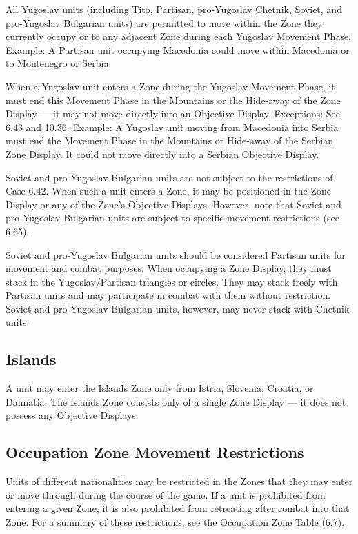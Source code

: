  All Yugoslav units (including Tito, Partisan, pro-Yugoslav Chetnik, Soviet, and pro-Yugoslav Bulgarian units) are permitted to move within the Zone they currently occupy or to any adjacent Zone during each Yugoslav Movement Phase. Example: A Partisan unit occupying Macedonia could move within Macedonia or to Montenegro or Serbia.

 When a Yugoslav unit enters a Zone during the Yugoslav Movement Phase, it must end this Movement Phase in the Mountains or the Hide-away of the Zone Display — it may not move directly into an Objective Display. Exceptions: See 6.43 and 10.36. Example: A Yugoslav unit moving from Macedonia into Serbia must end the Movement Phase in the Mountains or Hide-away of the Serbian Zone Display. It could not move directly into a Serbian Objective Display.

 Soviet and pro-Yugoslav Bulgarian units are not subject to the restrictions of Case 6.42. When such a unit enters a Zone, it may be positioned in the Zone Display or any of the Zone’s Objective Displays. However, note that Soviet and pro-Yugoslav Bulgarian units are subject to specific movement restrictions (see 6.65).

 Soviet and pro-Yugoslav Bulgarian units should be considered Partisan units for movement and combat purposes. When occupying a Zone Display, they must stack in the Yugoslav/Partisan triangles or circles. They may stack freely with Partisan units and may participate in combat with them without restriction. Soviet and pro-Yugoslav Bulgarian units, however, may never stack with Chetnik units.

\subsection{Islands}\label{sec:6.5}

A unit may enter the Islands Zone only from Istria, Slovenia, Croatia, or Dalmatia. The Islands Zone consists only of a single Zone Display — it does not possess any Objective Displays.

\subsection{Occupation Zone Movement Restrictions}\label{sec:6.6}

Units of different nationalities may be restricted in the Zones that they may enter or move through during the course of the game. If a unit is prohibited from entering a given Zone, it is also prohibited from retreating after combat into that Zone. For a summary of these restrictions, see the Occupation Zone Table (6.7).


